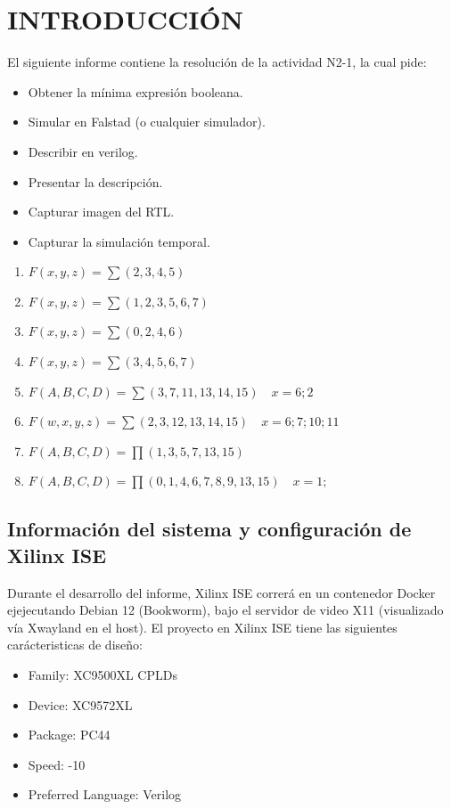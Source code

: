 \section{INTRODUCCIÓN}
El siguiente informe contiene la resolución de la actividad N2-1, la cual pide:
\begin{itemize}[nosep]
    \item Obtener la mínima expresión booleana.
    \item Simular en Falstad (o cualquier simulador).
    \item Describir en verilog.
    \item Presentar la descripción.
    \item Capturar imagen del RTL.
    \item Capturar la simulación temporal.
\end{itemize}
\begin{enumerate}
\item $\displaystyle F(x, y, z) = \sum(2, 3, 4, 5)$
\item $\displaystyle F(x, y, z) = \sum(1, 2, 3, 5, 6, 7)$
\item $\displaystyle F(x, y, z) = \sum(0, 2, 4, 6)$
\item $\displaystyle F(x, y, z) = \sum(3, 4, 5, 6, 7)$
\item $\displaystyle F(A, B, C, D) = \sum(3, 7, 11, 13, 14, 15) \quad x = 6; 2$
\item $\displaystyle F(w, x, y, z) = \sum(2, 3, 12, 13, 14, 15) \quad x = 6; 7; 10; 11$
\item $\displaystyle F(A, B, C, D) = \prod(1, 3, 5, 7, 13, 15)$
\item $\displaystyle F(A, B, C, D) = \prod(0, 1, 4, 6, 7, 8, 9, 13, 15) \quad x = 1;$
\end{enumerate}

\subsection{Información del sistema y configuración de Xilinx ISE}

Durante el desarrollo del informe, Xilinx ISE correrá en un contenedor Docker ejejecutando Debian 12 (Bookworm), bajo el servidor de video X11 (visualizado vía Xwayland en el host).
El proyecto en Xilinx ISE tiene las siguientes carácteristicas de diseño:
\begin{itemize}[nosep]
    \item Family:   XC9500XL    CPLDs
    \item Device:   XC9572XL
    \item Package:  PC44
    \item Speed:    -10 
    \item Preferred Language:   Verilog
\end{itemize}
